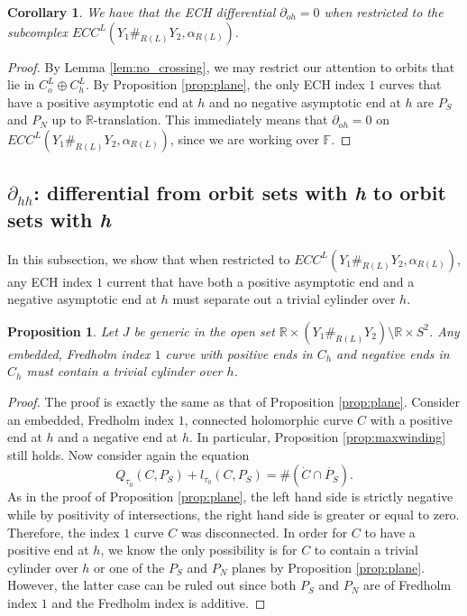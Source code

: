 \documentclass{article}
\numberwithin{equation}{section}
\newtheorem{proposition}[theorem]{Proposition}
\newtheorem{corollary}[theorem]{Corollary}
\theoremstyle{definition}
\newcommand{\R}{\mathbb{R}}
\newcommand{\F}{\mathbb{F}}
\begin{document}
\begin{corollary}
\label{cor:L_oh}
We have that the ECH differential
$\partial_{oh} = 0$
when restricted to the subcomplex $ECC^L(Y_1 \#_{R(L)} Y_2, \alpha_{R(L)})$.
\end{corollary}
\begin{proof}
By Lemma \ref{lem:no_crossing}, we may restrict our attention to orbits that lie in $C_o^L \oplus C_h^L$. By Proposition \ref{prop:plane}, the only ECH index $1$ curves that have a positive asymptotic end at $h$ and no negative asymptotic end at $h$ are $P_S$ and $P_N$ up to $\R$-translation. This immediately means that $\partial_{oh} = 0$ on $ECC^L(Y_1 \#_{R(L)} Y_2,\alpha_{R(L)})$, since we are working over $\F$.
\end{proof}


\subsection{\texorpdfstring{$\partial_{hh}$}{diff hh}: differential from orbit sets with \emph{h} to orbit sets with \emph{h}}
In this subsection, we show that when restricted to $ECC^L(Y_1 \#_{R(L)} Y_2, \alpha_{R(L)})$, any ECH index $1$ current that have both a positive asymptotic end and a negative asymptotic end at $h$ must separate out a trivial cylinder over $h$.
\begin{proposition}
\label{prop:trivcyl}
Let $J$ be generic in the open set $\mathbb{R}\times (Y_1\#_{R(L)}Y_2)\setminus \mathbb{R} \times S^2$. Any embedded, Fredholm index $1$ curve with positive ends in $C_h$ and negative ends in $C_h$ must contain a trivial cylinder over $h$.
\end{proposition}
\begin{proof}
The proof is exactly the same as that of Proposition \ref{prop:plane}. Consider an embedded, Fredholm index $1$, connected holomorphic curve $C$ with a positive end at $h$ and a negative end at $h$. In particular, Proposition \ref{prop:maxwinding} still holds. Now consider again the equation 
$$Q_{\tau_0}(C, P_S) + l_{\tau_0}(C, P_S) =  \#(\dot{C} \cap \dot{P_S}).$$
As in the proof of Proposition \ref{prop:plane}, the left hand side is strictly negative while by positivity of intersections, the right hand side is greater or equal to zero. Therefore, the index $1$ curve $C$ was disconnected. In order for $C$ to have a positive end at $h$, we know the only possibility is for $C$ to contain a trivial cylinder over $h$ or one of the $P_S$ and $P_N$ planes by Proposition \ref{prop:plane}. However, the latter case can be ruled out since both $P_S$ and $P_N$ are of Fredholm index $1$ and the Fredholm index is additive.
\end{proof}
\end{document}
